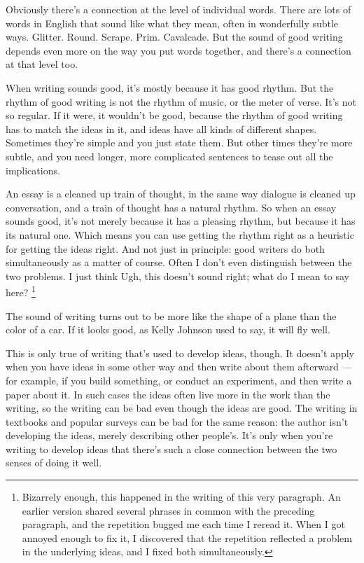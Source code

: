 Obviously there's a connection at the level of individual words. There
are lots of words in English that sound like what they mean, often in
wonderfully subtle ways. Glitter. Round. Scrape. Prim. Cavalcade. But
the sound of good writing depends even more on the way you put words
together, and there's a connection at that level too.

When writing sounds good, it's mostly because it has good rhythm. But
the rhythm of good writing is not the rhythm of music, or the meter of
verse. It's not so regular. If it were, it wouldn't be good, because the
rhythm of good writing has to match the ideas in it, and ideas have all
kinds of different shapes. Sometimes they're simple and you just state
them. But other times they're more subtle, and you need longer, more
complicated sentences to tease out all the implications.

An essay is a cleaned up train of thought, in the same way dialogue is
cleaned up conversation, and a train of thought has a natural rhythm. So
when an essay sounds good, it's not merely because it has a pleasing
rhythm, but because it has its natural one. Which means you can use
getting the rhythm right as a heuristic for getting the ideas right. And
not just in principle: good writers do both simultaneously as a matter
of course. Often I don't even distinguish between the two problems. I
just think Ugh, this doesn't sound right; what do I mean to say here?
\footnote{Bizarrely enough, this happened in the writing of this very
paragraph. An earlier version shared several phrases in common with the
preceding paragraph, and the repetition bugged me each time I reread it.
When I got annoyed enough to fix it, I discovered that the repetition
reflected a problem in the underlying ideas, and I fixed both
simultaneously.}

The sound of writing turns out to be more like the shape of a plane than
the color of a car. If it looks good, as Kelly Johnson used to say, it
will fly well.

This is only true of writing that's used to develop ideas, though. It
doesn't apply when you have ideas in some other way and then write about
them afterward --- for example, if you build something, or conduct an
experiment, and then write a paper about it. In such cases the ideas
often live more in the work than the writing, so the writing can be bad
even though the ideas are good. The writing in textbooks and popular
surveys can be bad for the same reason: the author isn't developing the
ideas, merely describing other people's. It's only when you're writing
to develop ideas that there's such a close connection between the two
senses of doing it well.

